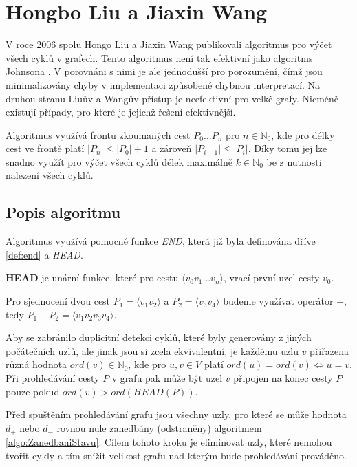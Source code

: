 \chapter{Hongbo Liu a Jiaxin Wang}
    \label{chapter:Algo3}
    V roce 2006 spolu Hongo Liu a Jiaxin Wang publikovali algoritmus \cite{A_new_way_to_enumerate_cycles_in_graph} pro výčet všech cyklů v grafech. Tento algoritmus není tak efektivní jako algoritms Johnsona \cite{Johnson_1975}. V porovnáni s nimi je ale jednodušší pro porozumění, čímž jsou minimalizovány chyby v implementaci způsobené chybnou interpretací. Na druhou stranu Liuův a Wangův přístup je neefektivní pro velké grafy. Nicméně existují případy, pro které je jejichž řešení efektivnější.

    Algoritmus využívá frontu zkoumaných cest $P_0 \dots P_n$ pro $n \in \mathbb{N}_0$, kde pro délky cest ve frontě platí $|P_n| \leq |P_0| + 1$ a zároveň $|P_{i-1}| \leq |P_{i}|$. Díky tomu jej lze snadno využít pro výčet všech cyklů délek maximálně $k \in \mathbb{N}_0$ be z nutnosti nalezení všech cyklů.

    \section{Popis algoritmu}
        Algoritmus využívá pomocné funkce \textit{END}, která již byla definována dříve \ref{def:end} a \textit{HEAD}.

        \begin{definition}
            \textbf{HEAD} je unární funkce, které pro cestu $\langle v_0 v_1 \dots v_n \rangle$, vrací první uzel cesty $v_0$.
        \end{definition}

        \vspace*{1em}
        Pro sjednocení dvou cest $P_1 = \langle v_1v_2 \rangle$ a $P_2 = \langle v_3v_4 \rangle$ budeme využívat operátor $+$, tedy $P_1 + P_2 = \langle v_1v_2v_3v_4 \rangle$.

        Aby se zabránilo duplicitní detekci cyklů, které byly generovány z jiných počátečních uzlů, ale jinak jsou si zcela ekvivalentní, je každému uzlu $v$ přiřazena různá hodnota $ord(v) \in \mathbb{N}_0$, kde pro $u, v \in V$ platí $ord(u) = ord(v) \iff u = v$. Při prohledávání cesty $P$ v grafu pak může být uzel $v$ připojen na konec cesty $P$ pouze pokud $ord(v) > ord(\textit{HEAD}(P))$.

        Před spuštěním prohledávání grafu jsou všechny uzly, pro které se může hodnota $d_+$ nebo $d_-$ rovnou nule zanedbány (odstraněny) algoritmem \ref{algo:ZanedbaniStavu}. Cílem tohoto kroku je eliminovat uzly, které nemohou tvořit cykly a tím snížit velikost grafu nad kterým bude prohledávání prováděno.


